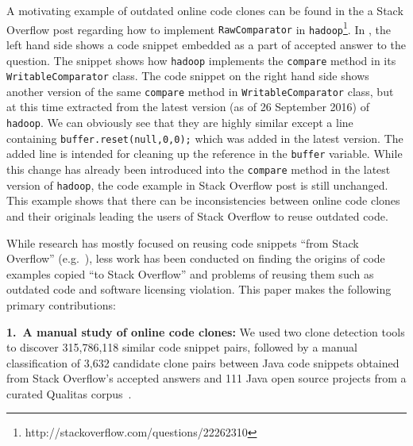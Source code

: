 \documentclass[sigconf,review, anonymous]{acmart}
\begin{document}
A motivating example of outdated online code clones can be found in the a Stack Overflow post regarding how to implement {\small{\texttt{RawComparator}}} in \texttt{hadoop}\footnote{http://stackoverflow.com/questions/22262310}. In , the left hand side shows a code snippet embedded as a part of accepted answer to the question. The snippet shows how {\small{\texttt{hadoop}}} implements the {\small{\texttt{compare}}} method in its {\small{\texttt{WritableComparator}}} class. The code snippet on the right hand side shows another version of the same {\small{\texttt{compare}}} method in {\small{\texttt{WritableComparator}}} class, but at this time extracted from the latest version (as of 26 September 2016) of {\small{\texttt{hadoop}}}. We can obviously see that they are highly similar except a line containing {\small{\verb|buffer.reset(null,0,0);|}} which was added in the latest version. The added line is intended for cleaning up the reference in the {\small{\verb|buffer|}} variable. While this change has already been introduced into the {\small{\texttt{compare}}} method in the latest version of {\small{\texttt{hadoop}}}, the code example in Stack Overflow post is still unchanged. This example shows that there can be inconsistencies between online code clones and their originals leading the users of Stack Overflow to reuse outdated code. %

While research has mostly focused on reusing code snippets ``from Stack Overflow'' (e.g.~\cite{Keivanloo2014,An2017,Yang2016}), less work has been conducted on finding the origins of code examples copied ``to Stack Overflow'' and problems of reusing them such as outdated code and software licensing violation. This paper makes the following  primary contributions:

\vspace{0.5ex}%
\noindent\textbf{1.~A manual study of online code clones:} 
We used two clone detection tools to discover 315,786,118 similar code snippet pairs, followed by a manual classification of 3,632 candidate clone pairs between Java code snippets obtained from Stack Overflow's accepted answers and 111 Java open source projects from a curated Qualitas corpus~\cite{QualitasCorpus}.
\end{document}
